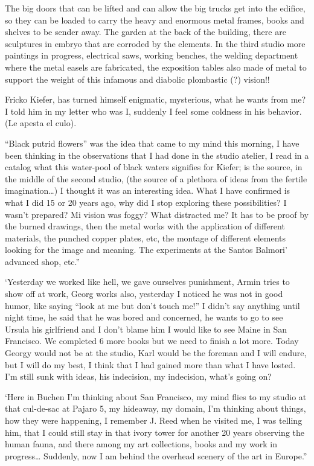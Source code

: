 \documentclass[smalldemyvopaper,11pt,twoside,onecolumn,openright,extrafontsizes]{memoir}
\begin{document}
The big doors that can be lifted and can allow the big trucks get into the edifice, so they can be loaded to carry the heavy and enormous metal frames, books and shelves to be sender away. The garden at the back of the building, there are sculptures in embryo that are corroded by the elements. In the third studio more paintings in progress, electrical saws, working benches, the welding department where the metal easels are fabricated, the exposition tables also made of metal to support the weight of this infamous and diabolic plombastic (?) vision!!

Fricko Kiefer, has turned himself enigmatic, mysterious, what he wants from me? I told him in my letter who was I, suddenly I feel some coldness in his behavior. (Le apesta el culo).

\ornamentbreak

“Black putrid flowers” was the idea that came to my mind this morning, I have been thinking in the observations that I had done in the studio atelier, I read in a catalog what this water-pool of black waters signifies for Kiefer; is the source, in the middle of the second studio, (the source of a plethora of ideas from the fertile imagination…) I thought it was an interesting idea. What I have confirmed is what I did 15 or 20 years ago, why did I stop exploring these possibilities? I wasn’t prepared? Mi vision was foggy? What distracted me? It has to be proof by the burned drawings, then the metal works with the application of different materials, the punched copper plates, etc, the montage of different elements looking for the image and meaning. The experiments at the Santos Balmori’ advanced shop, etc.”

\ornamentbreak

‘Yesterday we worked like hell, we gave ourselves punishment, Armin tries to show off at work, Georg works also, yesterday I noticed he was not in good humor, like saying “look at me but don’t touch me!” I didn’t say anything until night time, he said that he was bored and concerned, he wants to go to see Ursula his girlfriend and I don’t blame him I would like to see Maine in San Francisco. We completed 6 more books but we need to finish a lot more. Today Georgy would not be at the studio, Karl would be the foreman and I will endure, but I will do my best, I think that I had gained more than what I have losted. I’m still sunk with ideas, his indecision, my indecision, what’s going on?

‘Here in Buchen I’m thinking about San Francisco, my mind flies to my studio at that cul-de-sac at Pajaro 5, my hideaway, my domain, I’m thinking about things, how they were happening, I remember J. Reed when he visited me, I was telling him, that I could still stay in that ivory tower for another 20 years observing the human fauna, and there among my art collections, books and my work in progress… Suddenly, now I am behind the overhead scenery of the art in Europe.”
\end{document}
